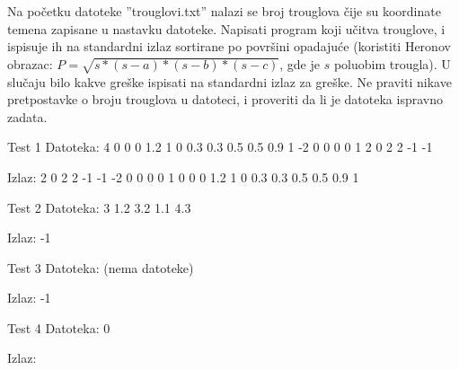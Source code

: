 \begin{Exercise}[label=905]

Na početku datoteke ''trouglovi.txt'' nalazi se broj trouglova čije su koordinate temena zapisane u nastavku datoteke. Napisati
  program koji učitva trouglove, i ispisuje ih na standardni izlaz
  sortirane po površini opadajuće (koristiti Heronov obrazac: 
  $P = \sqrt{s*(s-a)*(s-b)*(s-c)}$, gde je $s$ poluobim trougla). U slučaju bilo kakve greške ispisati  na standardni izlaz za greške. Ne praviti nikave pretpostavke o broju trouglova u datoteci, i proveriti da li je datoteka ispravno zadata.

\begin{minitest}
\begin{test}{Test 1}
Datoteka:  4                         
           0 0 0 1.2 1 0          
           0.3 0.3 0.5 0.5 0.9 1
           -2 0 0 0 0 1
           2 0 2 2 -1 -1

Izlaz:     2 0 2 2 -1 -1             
           -2 0 0 0 0 1
           0 0 0 1.2 1 0
           0.3 0.3 0.5 0.5 0.9 1                                                   
\end{test}
\end{minitest}
\begin{minitest}
\begin{test}{Test 2}
Datoteka:  3             
          1.2 3.2 1.1 4.3

Izlaz:     -1                                            
\end{test}
\end{minitest}

\begin{minitest}
\begin{test}{Test 3}
Datoteka:   (nema datoteke)

Izlaz:     -1                                            
\end{test}
\end{minitest}
\begin{minitest}
\begin{test}{Test 4}
Datoteka:   0

Izlaz:                                                 
\end{test}
\end{minitest}
\end{Exercise}

\begin{Answer}[ref=905]
\end{Answer}

